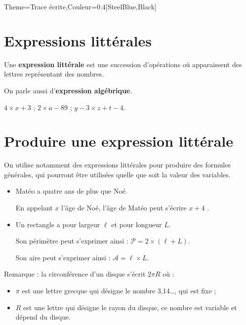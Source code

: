\begin{Maquette}[Cours]{Theme={Trace écrite},Couleur={0.4[SteelBlue,Black]}}

   \section{Expressions littérales}
   
      \begin{definition*}{}
         Une {\bf expression littérale} est une succession d'opérations où apparaissent des lettres représentant des nombres. \par
         On parle aussi d'{\bf expression algébrique}.
      \end{definition*}
      
      \begin{exemple*}{}
         $4\times x+3$ \; ; \; $2\times a-89$ \; ; \; $y-3\times z+t-4$.
      \end{exemple*}
   
   
   \section{Produire une expression littérale}
   
      On utilise notamment des expressions littérales pour produire des  formules générales, qui pourront être utilisées quelle que soit la valeur des variables.
      
      \begin{exemple*}{}
         \begin{itemize}
            \item Matéo a quatre ans de plus que Noé. \par
               En appelant \og $x$ \fg{} l'âge de Noé, l'âge de Matéo peut s'écrire \og $x+4$ \fg.
            \item Un rectangle a pour largeur $\ell$ et pour longueur $L$. \par
               Son périmètre peut s'exprimer ainsi : $\mathcal{P} =2\times(\ell+L)$. \par
               Son aire peut s'exprimer ainsi : $\mathcal{A} =\ell\times L$. \par
         \end{itemize}
      \end{exemple*}
      
      Remarque : la circonférence d'un disque s'écrit $2\pi R$ où :
         \begin{itemize}
            \item $\pi$ est une lettre grecque qui désigne le nombre 3,14\dots, qui est fixe ;
            \item $R$ est une lettre qui désigne le rayon du disque, ce nombre est variable et dépend du disque.
         \end{itemize}
   

\end{Maquette}
